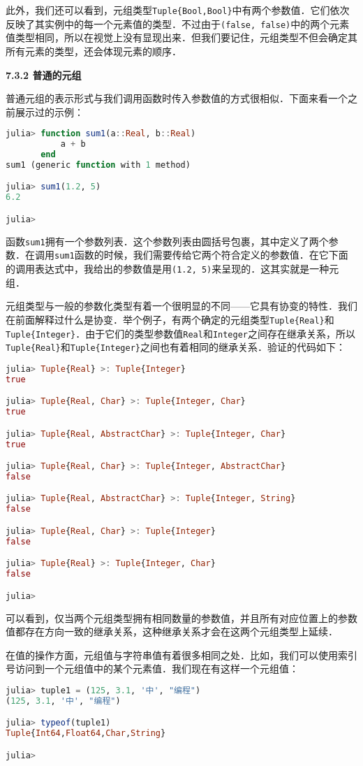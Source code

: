 此外，我们还可以看到，元组类型\verb|Tuple{Bool,Bool}|中有两个参数值．它们依次反映了其实例中的每一个元素值的类型．不过由于\verb|(false, false)|中的两个元素值类型相同，所以在视觉上没有显现出来．但我们要记住，元组类型不但会确定其所有元素的类型，还会体现元素的顺序．

\textbf{7.3.2 普通的元组}

普通元组的表示形式与我们调用函数时传入参数值的方式很相似．下面来看一个之前展示过的示例：
\begin{lstlisting}[language=julia]
julia> function sum1(a::Real, b::Real)
           a + b
       end
sum1 (generic function with 1 method)

julia> sum1(1.2, 5)
6.2

julia> 
\end{lstlisting}

函数\verb|sum1|拥有一个参数列表．这个参数列表由圆括号包裹，其中定义了两个参数．在调用\verb|sum1|函数的时候，我们需要传给它两个符合定义的参数值．在它下面的调用表达式中，我给出的参数值是用\verb|(1.2, 5)|来呈现的．这其实就是一种元组．

元组类型与一般的参数化类型有着一个很明显的不同——它具有协变的特性．我们在前面解释过什么是协变．举个例子，有两个确定的元组类型\verb|Tuple{Real}|和\verb|Tuple{Integer}|．由于它们的类型参数值\verb|Real|和\verb|Integer|之间存在继承关系，所以\verb|Tuple{Real}|和\verb|Tuple{Integer}|之间也有着相同的继承关系．验证的代码如下：
\begin{lstlisting}[language=julia]
julia> Tuple{Real} >: Tuple{Integer}
true

julia> Tuple{Real, Char} >: Tuple{Integer, Char}
true

julia> Tuple{Real, AbstractChar} >: Tuple{Integer, Char}
true

julia> Tuple{Real, Char} >: Tuple{Integer, AbstractChar}
false

julia> Tuple{Real, AbstractChar} >: Tuple{Integer, String}
false

julia> Tuple{Real, Char} >: Tuple{Integer}
false

julia> Tuple{Real} >: Tuple{Integer, Char}
false

julia> 
\end{lstlisting}

可以看到，仅当两个元组类型拥有相同数量的参数值，并且所有对应位置上的参数值都存在方向一致的继承关系，这种继承关系才会在这两个元组类型上延续．

在值的操作方面，元组值与字符串值有着很多相同之处．比如，我们可以使用索引号访问到一个元组值中的某个元素值．我们现在有这样一个元组值：
\begin{lstlisting}[language=julia]
julia> tuple1 = (125, 3.1, '中', "编程")
(125, 3.1, '中', "编程")

julia> typeof(tuple1)
Tuple{Int64,Float64,Char,String}

julia> 
\end{lstlisting}

